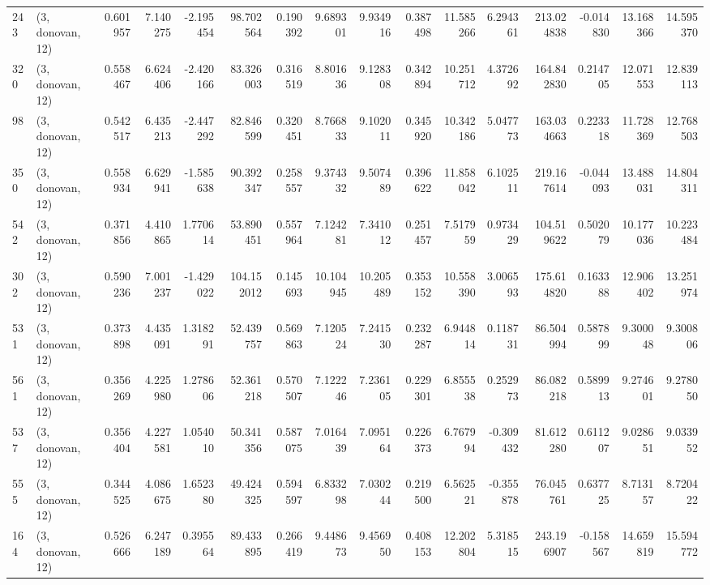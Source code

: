 \begin{tabular}{llrrrrrrrrrrrrrr}
243 &  (3, donovan, 12) &   0.601957 &   7.140275 &  -2.195454 &    98.702564 &   0.190392 &   9.689301 &   9.934916 &  0.387498 &  11.585266 &   6.294361 &   213.024838 & -0.014830 &  13.168366 &  14.595370 \\
320 &  (3, donovan, 12) &   0.558467 &   6.624406 &  -2.420166 &    83.326003 &   0.316519 &   8.801636 &   9.128308 &  0.342894 &  10.251712 &   4.372692 &   164.842830 &  0.214705 &  12.071553 &  12.839113 \\
98  &  (3, donovan, 12) &   0.542517 &   6.435213 &  -2.447292 &    82.846599 &   0.320451 &   8.766833 &   9.102011 &  0.345920 &  10.342186 &   5.047773 &   163.034663 &  0.223318 &  11.728369 &  12.768503 \\
350 &  (3, donovan, 12) &   0.558934 &   6.629941 &  -1.585638 &    90.392347 &   0.258557 &   9.374332 &   9.507489 &  0.396622 &  11.858042 &   6.102511 &   219.167614 & -0.044093 &  13.488031 &  14.804311 \\
542 &  (3, donovan, 12) &   0.371856 &   4.410865 &   1.770614 &    53.890451 &   0.557964 &   7.124281 &   7.341012 &  0.251457 &   7.517959 &   0.973429 &   104.519622 &  0.502079 &  10.177036 &  10.223484 \\
302 &  (3, donovan, 12) &   0.590236 &   7.001237 &  -1.429022 &   104.152012 &   0.145693 &  10.104945 &  10.205489 &  0.353152 &  10.558390 &   3.006593 &   175.614820 &  0.163388 &  12.906402 &  13.251974 \\
531 &  (3, donovan, 12) &   0.373898 &   4.435091 &   1.318291 &    52.439757 &   0.569863 &   7.120524 &   7.241530 &  0.232287 &   6.944814 &   0.118731 &    86.504994 &  0.587899 &   9.300048 &   9.300806 \\
561 &  (3, donovan, 12) &   0.356269 &   4.225980 &   1.278606 &    52.361218 &   0.570507 &   7.122246 &   7.236105 &  0.229301 &   6.855538 &   0.252973 &    86.082218 &  0.589913 &   9.274601 &   9.278050 \\
537 &  (3, donovan, 12) &   0.356404 &   4.227581 &   1.054010 &    50.341356 &   0.587075 &   7.016439 &   7.095164 &  0.226373 &   6.767994 &  -0.309432 &    81.612280 &  0.611207 &   9.028651 &   9.033952 \\
555 &  (3, donovan, 12) &   0.344525 &   4.086675 &   1.652380 &    49.424325 &   0.594597 &   6.833298 &   7.030244 &  0.219500 &   6.562521 &  -0.355878 &    76.045761 &  0.637725 &   8.713157 &   8.720422 \\
164 &  (3, donovan, 12) &   0.526666 &   6.247189 &   0.395564 &    89.433895 &   0.266419 &   9.448673 &   9.456950 &  0.408153 &  12.202804 &   5.318515 &   243.196907 & -0.158567 &  14.659819 &  15.594772 \\

\end{tabular}
